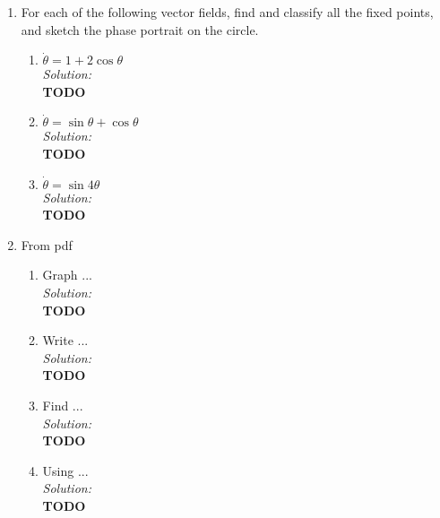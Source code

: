 \documentclass[10pt]{amsart}
\theoremstyle{nonumberplain}
\begin{document}
\begin{enumerate}[label={\bf {\arabic*}:}]
\item For each of the following vector fields, find and classify all the fixed points, and
sketch the phase portrait on the circle. \\
\begin{enumerate}

\item $\dot \theta = 1 + 2 \cos \theta$ \\
\textit{Solution:} \\
\textbf{TODO} \\

\item $\dot \theta = \sin \theta + \cos \theta$ \\
\textit{Solution:} \\
\textbf{TODO} \\

\item $\dot \theta = \sin 4 \theta$ \\
\textit{Solution:} \\
\textbf{TODO} \\

\end{enumerate}

\newpage

\item From pdf \\

\begin{enumerate}

\item Graph ... \\
\textit{Solution:} \\
\textbf{TODO} \\

\item Write ... \\
\textit{Solution:} \\
\textbf{TODO} \\

\item Find ... \\
\textit{Solution:} \\
\textbf{TODO} \\

\item Using ... \\
\textit{Solution:} \\
\textbf{TODO} \\


\end{enumerate}
\end{enumerate}
\end{document}
